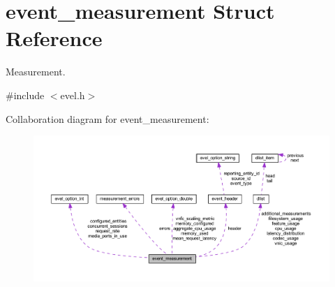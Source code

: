 \hypertarget{structevent__measurement}{}\section{event\+\_\+measurement Struct Reference}
\label{structevent__measurement}


Measurement.  




{\ttfamily \#include $<$evel.\+h$>$}



Collaboration diagram for event\+\_\+measurement\+:
\nopagebreak
\begin{figure}[H]
\begin{center}
\leavevmode
\includegraphics[width=350pt]{structevent__measurement__coll__graph}
\end{center}
\end{figure}
